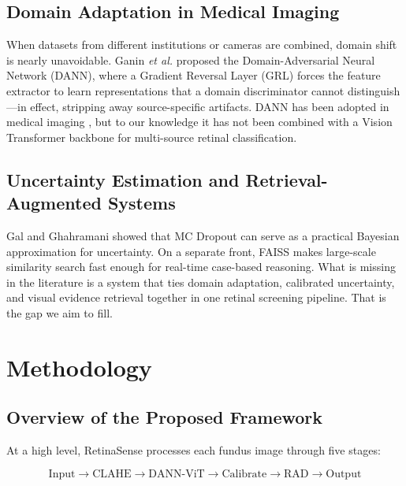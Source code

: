\documentclass[conference]{IEEEtran}
\begin{document}
\subsection{Domain Adaptation in Medical Imaging}

When datasets from different institutions or cameras are combined, domain shift is nearly unavoidable. Ganin \textit{et al.} \cite{b13} proposed the Domain-Adversarial Neural Network (DANN), where a Gradient Reversal Layer (GRL) forces the feature extractor to learn representations that a domain discriminator cannot distinguish---in effect, stripping away source-specific artifacts. DANN has been adopted in medical imaging \cite{b16}, but to our knowledge it has not been combined with a Vision Transformer backbone for multi-source retinal classification.

\subsection{Uncertainty Estimation and Retrieval-Augmented Systems}

Gal and Ghahramani \cite{b7} showed that MC Dropout can serve as a practical Bayesian approximation for uncertainty. On a separate front, FAISS \cite{b9} makes large-scale similarity search fast enough for real-time case-based reasoning. What is missing in the literature is a system that ties domain adaptation, calibrated uncertainty, and visual evidence retrieval together in one retinal screening pipeline. That is the gap we aim to fill.

\section{Methodology}

\subsection{Overview of the Proposed Framework}

At a high level, RetinaSense processes each fundus image through five stages:

\begin{equation*}
\text{Input} \!\rightarrow\! \text{CLAHE} \!\rightarrow\! \text{DANN-ViT} \!\rightarrow\! \text{Calibrate} \!\rightarrow\! \text{RAD} \!\rightarrow\! \text{Output}
\end{equation*}
\end{document}
